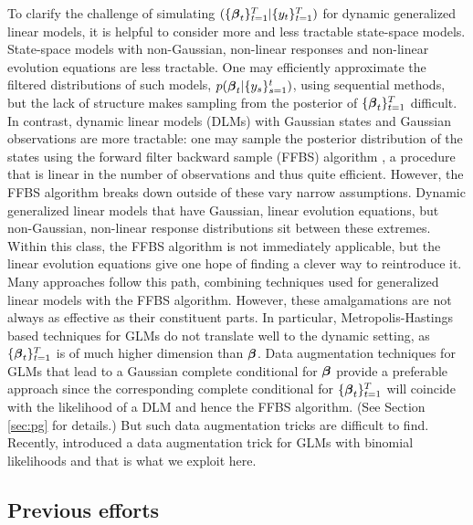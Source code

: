 \npoint To clarify the challenge of simulating $(\{\boldsymbol{\beta}_t\}_{t=1}^T |
\{y_t\}_{t=1}^T)$ for dynamic generalized linear models, it is helpful to
consider more and less tractable state-space models.  
\npoint State-space models with non-Gaussian, non-linear responses and
non-linear evolution equations are less tractable.  One may efficiently
approximate the filtered distributions of such models, $p(\boldsymbol{\beta}_t |
\{y_s\}_{s=1}^t)$, using sequential methods, but the lack of structure makes
sampling from the posterior of $\{\boldsymbol{\beta}_t\}_{t=1}^T$ difficult.  
\npoint In contrast, dynamic linear models (DLMs) with Gaussian states and
Gaussian observations are more tractable: one may sample the posterior
distribution of the states using the forward filter backward sample (FFBS)
algorithm \citep{carter-kohn-1994, fruhwirth-schnatter-1994}, a procedure that
is linear in the number of observations and thus quite efficient.  However, the
FFBS algorithm breaks down outside of these vary narrow assumptions.
\npoint Dynamic generalized linear models that have Gaussian, linear evolution
equations, but non-Gaussian, non-linear response distributions sit between these
extremes.  Within this class, the FFBS algorithm is not immediately applicable,
but the linear evolution equations give one hope of finding a clever way to
reintroduce it.  Many approaches follow this path, combining techniques used for
generalized linear models with the FFBS algorithm.  However, these amalgamations
are not always as effective as their constituent parts.  In particular,
Metropolis-Hastings based techniques for GLMs do not translate well to the
dynamic setting, as $\{\boldsymbol{\beta}_t\}_{t=1}^T$ is of much higher dimension than
$\boldsymbol{\beta}$.  
\npoint Data augmentation techniques for GLMs that lead to a Gaussian complete
conditional for $\boldsymbol{\beta}$ provide a preferable approach since the corresponding
complete conditional for $\{\boldsymbol{\beta}_t\}_{t=1}^T$ will coincide with the
likelihood of a DLM and hence the FFBS algorithm.  (See Section \ref{sec:pg} for
details.)  But such data augmentation tricks are difficult to find.  Recently,
\citet{polson-etal-2013} introduced a data augmentation trick for GLMs with
binomial likelihoods and that is what we exploit here.

\subsection{Previous efforts}
\label{sec:previous-efforts}

